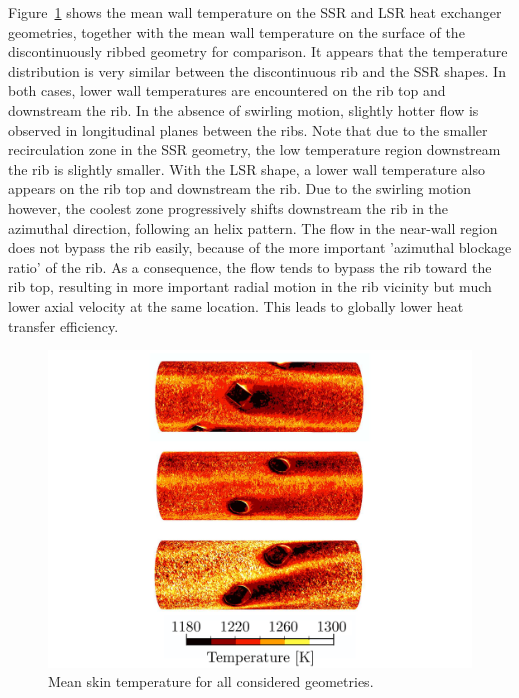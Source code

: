 Figure~\ref{Twall_compare} shows the mean wall temperature on the SSR and LSR heat exchanger geometries, together with the mean wall temperature on the surface of the discontinuously ribbed geometry for comparison. It appears that the temperature distribution is very similar between the discontinuous rib and the SSR shapes. In both cases, lower wall temperatures are encountered on the rib top and downstream the rib. In the absence of swirling motion, slightly hotter flow is observed in longitudinal planes between the ribs. Note that due to the smaller recirculation zone in the SSR geometry, the low temperature region downstream the rib is slightly smaller. With the LSR shape, a lower wall temperature also appears on the rib top and downstream the rib. Due to the swirling motion however, the coolest zone progressively shifts downstream the rib in the azimuthal direction, following an helix pattern. The flow in the near-wall region does not bypass the rib easily, because of the more important 'azimuthal blockage ratio' of the rib. As a consequence, the flow tends to bypass the rib toward the rib top, resulting in more important radial motion in the rib vicinity but much lower axial velocity at the same location. This leads to globally lower heat transfer efficiency.

\begin{figure}[h]
\centering
\includegraphics[width=0.7\linewidth]{fig/applications/optim/Twall_compare.pdf}
\caption{Mean skin temperature for all considered geometries.}
\label{Twall_compare}
\end{figure}

